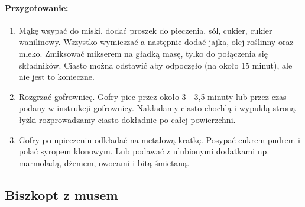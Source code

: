\documentclass{article}
\begin{document}
    \paragraph{Przygotowanie:}
    \begin{enumerate}
        \item Mąkę wsypać do miski, dodać proszek do pieczenia, sól, cukier,
            cukier wanilinowy. Wszystko wymieszać a następnie dodać jajka, olej
            roślinny oraz mleko. Zmiksować mikserem na gładką masę, tylko do
            połączenia się składników. Ciasto można odstawić aby odpoczęło (na
            około 15 minut), ale nie jest to konieczne.
        \item Rozgrzać gofrownicę. Gofry piec przez około 3 - 3,5 minuty lub
            przez czas podany w instrukcji gofrownicy. Nakładamy ciasto chochlą
            i wypukłą stroną łyżki rozprowadzamy ciasto dokładnie po całej
            powierzchni.
        \item Gofry po upieczeniu odkładać na metalową kratkę. Posypać cukrem
            pudrem i polać syropem klonowym. Lub podawać z ulubionymi dodatkami
            np. marmoladą, dżemem, owocami i bitą śmietaną.
    \end{enumerate}
    \newpage


    \subsection{Biszkopt z musem}
    \bigskip
\end{document}

